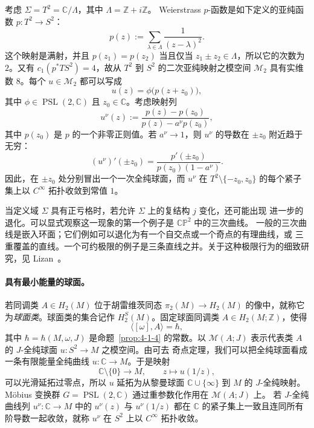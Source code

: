\begin{example}\label{ex:4-2-9}
考虑 $\Sigma=T^2=\mathbb C/\Lambda$，其中 $\Lambda=\mathbb Z+i\mathbb Z$。
Weierstrass $p$-函数是如下定义的亚纯函数 $p:T^2\to S^2$：
\[
  p(z):=\sum_{\lambda\in\Lambda}\frac1{(z-\lambda)^2}.
\]
这个映射是满射，并且
$p(z_1)=p(z_2)$ 当且仅当 $z_1\pm z_2\in\Lambda$，所以它的次数为 $2$。又有
$c_1(p^*TS^2)=4$，故从 $T^2$ 到 $S^2$ 的二次亚纯映射之模空间 $\mathcal M_2$
具有实维数 $8$。每个 $u\in\mathcal M_2$ 都可以写成
\[
  u(z)=\phi\bigl(p(z+z_0)\bigr),
\]
其中 $\phi\in\operatorname{PSL}(2,\mathbb C)$ 且 $z_0\in\mathbb C$。考虑映射列
\[
  u^\nu(z):=\frac{p(z)-p(z_0)}{p(z)-a^\nu p(z_0)},
\]
其中 $p(z_0)$ 是 $p$ 的一个非零正则值。若 $a^\nu\to1$，则 $u^\nu$ 的导数在
$\pm z_0$ 附近趋于无穷：
\[
  (u^\nu)'(\pm z_0)
  =\frac{p'(\pm z_0)}{p(z_0)(1-a^\nu)}.
\]
因此，在 $\pm z_0$ 处分别冒出一个一次全纯球面，而 $u^\nu$ 在
$T^2\setminus\{-z_0,z_0\}$ 的每个紧子集上以 $C^\infty$ 拓扑收敛到常值 $1$。
\end{example}

\begin{remark}\label{rem:4-2-10}
当定义域 $\Sigma$ 具有正亏格时，若允许 $\Sigma$ 上的复结构 $j$ 变化，还可能出现
进一步的退化。可以显式观察这一现象的第一个例子是 $\mathbb{CP}^2$ 中的三次曲线。
一般的三次曲线是嵌入环面；它们例如可以退化为有一个自交点或一个奇点的有理曲线，或
三重覆盖的直线。一个可约极限的例子是三条直线之并。关于这种极限行为的细致研究，见
Lizan \,。
\end{remark}

\paragraph{具有最小能量的球面。}
若同调类 $A\in H_2(M)$ 位于胡雷维茨同态
$\pi_2(M)\to H_2(M)$ 的像中，就称它为\emph{球面类}。球面类的集合记作
$H_2^S(M)$。固定球面同调类 $A\in H_2(M;\mathbb Z)$，使得
\[
  \langle[\omega],A\rangle=\hbar,
\]
其中 $\hbar=\hbar(M,\omega,J)$ 是命题~\ref{prop:4-1-4} 的常数。以
$\mathcal M(A;J)$ 表示代表类 $A$ 的 $J$-全纯球面 $u:S^2\to M$ 之模空间。由可去
奇点定理，我们可以把全纯球面看成一条有限能量全纯曲线 $u:\mathbb C\to M$。于是映射
\[
  \mathbb C\setminus\{0\}\longrightarrow M,
  \qquad z\longmapsto u(1/z),
\]
可以光滑延拓过零点，所以 $u$ 延拓为从黎曼球面
$\mathbb C\cup\{\infty\}$ 到 $M$ 的 $J$-全纯映射。Möbius 变换群
$G=\operatorname{PSL}(2,\mathbb C)$ 通过重参数化作用在 $\mathcal M(A;J)$ 上。
若 $J$-全纯曲线列 $u^\nu:\mathbb C\to M$ 中的 $u^\nu(z)$ 与 $u^\nu(1/z)$ 都在
$\mathbb C$ 的紧子集上一致且连同所有阶导数一起收敛，就称 $u^\nu$ 在 $S^2$ 上以
$C^\infty$ 拓扑收敛。

